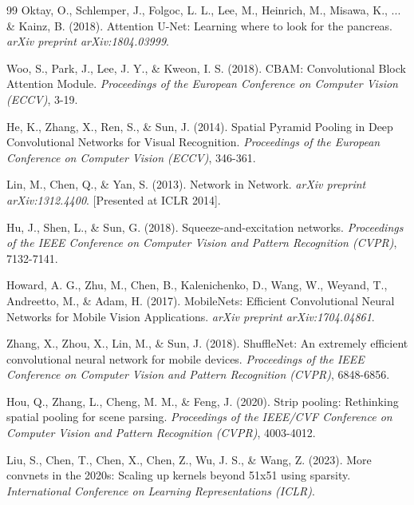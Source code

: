 \documentclass[runningheads]{llncs}
\begin{document}
\begin{thebibliography}{99}
Oktay, O., Schlemper, J., Folgoc, L. L., Lee, M., Heinrich, M., Misawa, K., ... \& Kainz, B. (2018). Attention U-Net: Learning where to look for the pancreas. \textit{arXiv preprint arXiv:1804.03999}.

Woo, S., Park, J., Lee, J. Y., \& Kweon, I. S. (2018). CBAM: Convolutional Block Attention Module. \textit{Proceedings of the European Conference on Computer Vision (ECCV)}, 3-19.

He, K., Zhang, X., Ren, S., \& Sun, J. (2014). Spatial Pyramid Pooling in Deep Convolutional Networks for Visual Recognition. \textit{Proceedings of the European Conference on Computer Vision (ECCV)}, 346-361.

Lin, M., Chen, Q., \& Yan, S. (2013). Network in Network. \textit{arXiv preprint arXiv:1312.4400}. [Presented at ICLR 2014].

Hu, J., Shen, L., \& Sun, G. (2018). Squeeze-and-excitation networks. \textit{Proceedings of the IEEE Conference on Computer Vision and Pattern Recognition (CVPR)}, 7132-7141.

Howard, A. G., Zhu, M., Chen, B., Kalenichenko, D., Wang, W., Weyand, T., Andreetto, M., \& Adam, H. (2017). MobileNets: Efficient Convolutional Neural Networks for Mobile Vision Applications. \textit{arXiv preprint arXiv:1704.04861}.

Zhang, X., Zhou, X., Lin, M., \& Sun, J. (2018). ShuffleNet: An extremely efficient convolutional neural network for mobile devices. \textit{Proceedings of the IEEE Conference on Computer Vision and Pattern Recognition (CVPR)}, 6848-6856.


Hou, Q., Zhang, L., Cheng, M. M., \& Feng, J. (2020). Strip pooling: Rethinking spatial pooling for scene parsing. \textit{Proceedings of the IEEE/CVF Conference on Computer Vision and Pattern Recognition (CVPR)}, 4003-4012.

Liu, S., Chen, T., Chen, X., Chen, Z., Wu, J. S., \& Wang, Z. (2023). More convnets in the 2020s: Scaling up kernels beyond 51x51 using sparsity. \textit{International Conference on Learning Representations (ICLR)}.


\end{thebibliography}
\end{document}
